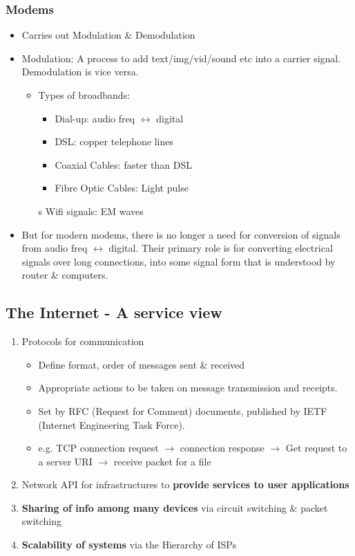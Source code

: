 \documentclass[a4paper]{article}
\begin{document}
\subsubsection{Modems}
\begin{itemize}
	\item Carries out Modulation \& Demodulation
	\item Modulation: A process to add text/img/vid/sound etc into a carrier signal. Demodulation is vice versa.
	\begin{itemize}[label=$\circ$]
		\item Types of broadbands:
		\begin{itemize}[label=\tiny$\blacksquare$]
			\item Dial-up: audio freq $\leftrightarrow$ digital
			\item DSL: copper telephone lines
			\item Coaxial Cables: faster than DSL
			\item Fibre Optic Cables: Light pulse
		\end{itemize}
		s
		Wifi signals: EM waves
	\end{itemize}
	\item But for modern modems, there is no longer a need for conversion of signals from audio freq $\leftrightarrow$ digital. Their primary role is for converting electrical signals over long connections, into some signal form that is understood by router \& computers.
\end{itemize}
\subsection{The Internet - A service view}
\begin{enumerate}
	\item Protocols for communication
	\begin{itemize}[label=$\circ$]
		\item Define format, order of messages sent \& received
		\item Appropriate actions to be taken on message transmission and receipts.
		\item Set by RFC (Request for Comment) documents, published by IETF (Internet Engineering Task Force).
		\item e.g. TCP connection request $\rightarrow$ connection response $\rightarrow$ Get request to a server URI $\rightarrow$ receive packet for a file
	\end{itemize}
	\item Network API for infrastructures to \textbf{provide services to user applications}
	\item \textbf{Sharing of info among many devices} via circuit switching \& packet switching
	\item \textbf{Scalability of systems} via the Hierarchy of ISPs
\end{enumerate}
\newpage
\end{document}
